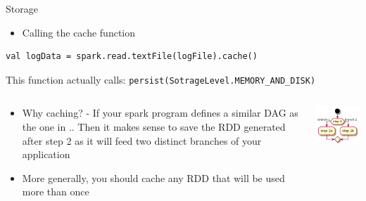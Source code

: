 \documentclass[presentation, aspectratio=169]{beamer}
\begin{document}
\begin{frame}[label={sec:orgee15ce6},fragile]{Storage}
 \begin{itemize}
\item Calling the cache function
\end{itemize}
\begin{verbatim}
val logData = spark.read.textFile(logFile).cache()
\end{verbatim}
This function actually calls: \texttt{persist(SotrageLevel.MEMORY\_AND\_DISK)}



\begin{columns}
\begin{column}{0.5\columnwidth}
\begin{itemize}
\item \alert{Why caching?} - If your spark program defines a similar DAG as the one in ..
Then it makes sense to save the RDD generated after step 2 as it will feed 
two distinct branches of your application
\item More generally, you should cache any RDD that will be used more than once
\end{itemize}
\end{column}

\begin{column}{0.5\columnwidth}
\begin{center}
\includegraphics[width=.9\linewidth]{dag.png}
\end{center}
\end{column}
\end{columns}
\end{frame}
\end{document}
